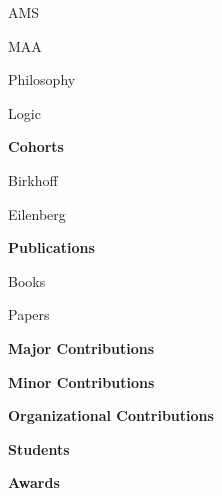 \documentclass[10pt]{article}
\begin{document}
\begin{outline}
\begin{outline}
\begin{outline}
			    \item AMS
			    \item MAA
			    \item Philosophy
			    \item Logic
			\end{outline}
		\item \textbf{Cohorts}
            \begin{outline}			
			    \item Birkhoff
			    \item Eilenberg
            \end{outline}		
		\item \textbf{Publications}
            \begin{outline}			
			    \item Books
			    \item Papers    
            \end{outline}		
        \item \textbf{Major Contributions}
        \item \textbf{Minor Contributions}
        \item \textbf{Organizational Contributions}
		\item \textbf{Students}
		\item \textbf{Awards}
	\end{outline}
\end{outline}
\end{document}
